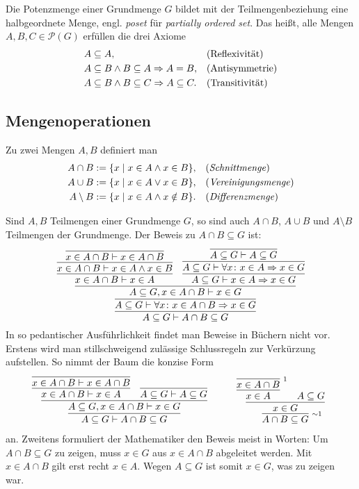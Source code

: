 Die Potenzmenge einer Grundmenge $G$ bildet mit der Teilmengenbeziehung
eine halbgeordnete Menge, engl. \emph{poset} für
\emph{partially ordered set}. Das heißt, alle Mengen
$A,B,C\in\mathcal P(G)$ erfüllen die drei Axiome
\begin{align*}
& A\subseteq A, &&\text{(Reflexivität)}\\
& A\subseteq B\land B\subseteq A\Rightarrow A = B, &&\text{(Antisymmetrie)}\\
& A\subseteq B\land B\subseteq C\Rightarrow A\subseteq C. &&\text{(Transitivität)}
\end{align*}

\newpage
\subsection{Mengenoperationen}

\begin{Definition}\newlinefirst
Zu zwei Mengen $A,B$ definiert man
\begin{align*}
A\cap B &:= \{x\mid x\in A\land x\in B\}, && \text{(\emph{Schnittmenge})}\\
A\cup B &:= \{x\mid x\in A\lor x\in B\}, && \text{(\emph{Vereinigungsmenge})}\\
A\setminus B &:= \{x\mid x\in A\land x\notin B\}. && \text{(\emph{Differenzmenge})}
\end{align*}
\end{Definition}
Sind $A,B$ Teilmengen einer Grundmenge $G$, so sind auch
$A\cap B$, $A\cup B$ und $A\setminus B$ Teilmengen der Grundmenge.
Der Beweis zu $A\cap B\subseteq G$ ist:
\[
\infer{A\subseteq G\vdash A\cap B\subseteq G}{
  \infer{A\subseteq G\vdash\forall x\colon x\in A\cap B\cond x\in G}{
    \infer{A\subseteq G, x\in A\cap B\vdash x\in G}{
      \infer{x\in A\cap B\vdash x\in A}{
        \infer{x\in A\cap B\vdash x\in A\land x\in B}{
          \infer{x\in A\cap B\vdash x\in A\cap B}{}}}
    & \infer{A\subseteq G\vdash x\in A\cond x\in G}{
        \infer{A\subseteq G\vdash \forall x\colon x\in A\cond x\in G}{
          \infer{A\subseteq G\vdash A\subseteq G}{}}}}}}
\]
In so pedantischer Ausführlichkeit findet man Beweise in Büchern
nicht vor. Erstens wird man stillschweigend zulässige Schlussregeln zur
Verkürzung aufstellen. So nimmt der Baum die konzise Form
\[
\begin{array}{@{}l@{\qquad\quad}l}
\infer{A\subseteq G\vdash A\cap B\subseteq G}{
  \infer{A\subseteq G,x\in A\cap B\vdash x\in G}{
    \infer{x\in A\cap B\vdash x\in A}{
      \infer{x\in A\cap B\vdash x\in A\cap B}{}}
  & \infer{A\subseteq G\vdash A\subseteq G}{}}}
&
\infer[\infernote{$\sim$1}]{A\cap B\subseteq G}{
  \infer{x\in G}{
    \infer{x\in A}{
      \infer[\infernote{1}]{x\in A\cap B}{}}
  & A\subseteq G}}
\end{array}
\]
an. Zweitens formuliert der Mathematiker den Beweis meist in Worten:
Um $A\cap B\subseteq G$ zu zeigen, muss $x\in G$ aus $x\in A\cap B$
abgeleitet werden. Mit $x\in A\cap B$ gilt erst recht $x\in A$.
Wegen $A\subseteq G$ ist somit $x\in G$, was zu zeigen war.\,\qedsymbol

